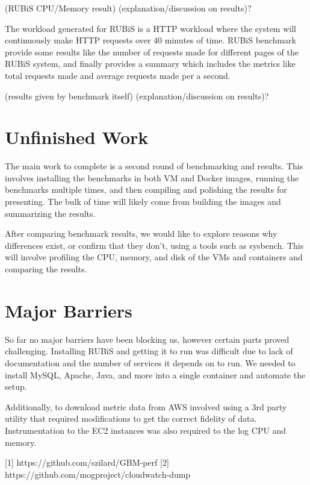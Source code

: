 \documentclass[11pt]{article}
\begin{document}
(RUBiS CPU/Memory result)
(explanation/discussion on results)?

The workload generated for RUBiS is a HTTP workload where the system will continuously make HTTP requests over 40 minutes of time. RUBiS benchmark provide some results like the number of requests made for different pages of the RUBiS system, and finally provides a summary which includes the metrics like total requests made and average requests made per a second. 

(results given by benchmark itself)
(explanation/discussion on results)?

\section{Unfinished Work}

The main work to complete is a second round of benchmarking and results. This involves installing the benchmarks in both VM and Docker images, running the benchmarks multiple times, and then compiling and polishing the results for presenting. The bulk of time will likely come from building the images and summarizing the results.

After comparing benchmark results, we would like to explore reasons why differences exist, or confirm that they don't, using a tools such as sysbench. This will involve profiling the CPU, memory, and disk of the VMs and containers and comparing the results.

\section{Major Barriers}

So far no major barriers have been blocking us, however certain parts proved challenging. Installing RUBiS and getting it to run was difficult due to lack of documentation and the number of services it depends on to run. We needed to install MySQL, Apache, Java, and more into a single container and automate the setup.

Additionally, to download metric data from AWS involved using a 3rd party utility that required modifications to get the correct fidelity of data. Instrumentation to the EC2 instances was also required to the log CPU and memory.

\hspace{16pt}

[1] https://github.com/szilard/GBM-perf
[2] https://github.com/mogproject/cloudwatch-dump
\end{document}
